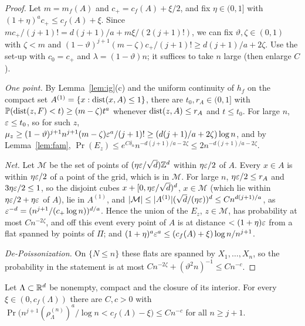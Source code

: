 \documentclass[11pt]{article}
\begin{document}
\begin{proof}
Let $m=m_f(A)$ and $c_+=c_f(A)+\xi/2$, and fix $\eta\in(0,1]$ with $(1+\eta)^ac_+\le c_f(A)+\xi$. Since $mc_+/(j+1)!=d(j+1)/a+m\xi/(2(j+1)!)$,
we can fix $\vartheta,\zeta\in(0,1)$ with $\zeta<m$ and $(1-\vartheta)^{j+1}(m-\zeta)c_+/(j+1)!\ge d(j+1)/a+2\zeta$. Use the set-up with $c_0=c_+$ and
$\lambda=(1-\vartheta)n$; it suffices to take $n$ large (then enlarge $C$).

\emph{One point.} By Lemma~\ref{lem:ig}(c) and the uniform continuity of $h_f$ on the compact set $A^{(1)}=\{x:\operatorname{dist}(x,A)\le1\}$,
there are $t_0,r_A\in(0,1]$ with $\mathbb{P}(\operatorname{dist}(z,F)<t)\ge(m-\zeta)t^a$ whenever $\operatorname{dist}(z,A)\le r_A$ and $t\le t_0$. For large $n$, $\varepsilon\le t_0$, so
for such $z$, $\mu_z\ge(1-\vartheta)^{j+1}n^{j+1}(m-\zeta)\varepsilon^a/(j+1)!\ge(d(j+1)/a+2\zeta)\log n$, and by Lemma~\ref{lem:fam},
$\Pr(E_z)\le e^{C\delta_n}n^{-d(j+1)/a-2\zeta}\le2n^{-d(j+1)/a-2\zeta}$.

\emph{Net.} Let $\mathcal M$ be the set of points of $(\eta\varepsilon/\sqrt d)\mathbb{Z}^d$ within $\eta\varepsilon/2$ of $A$. Every $x\in A$ is within $\eta\varepsilon/2$
of a point of the grid, which is in $\mathcal M$. For large $n$, $\eta\varepsilon/2\le r_A$ and $3\eta\varepsilon/2\le1$, so the disjoint cubes $x+[0,\eta\varepsilon/\sqrt d)^d$,
$x\in\mathcal M$ (which lie within $\eta\varepsilon/2+\eta\varepsilon$ of $A$), lie in $A^{(1)}$, and $|\mathcal M|\le|A^{(1)}|(\sqrt d/(\eta\varepsilon))^d\le Cn^{d(j+1)/a}$, as
$\varepsilon^{-d}=(n^{j+1}/(c_+\log n))^{d/a}$. Hence the union of the $E_z$, $z\in\mathcal M$,
has probability at most $Cn^{-2\zeta}$, and off this event every point of $A$ is at distance $<(1+\eta)\varepsilon$ from a flat spanned by
points of $\Pi$; and $(1+\eta)^a\varepsilon^a\le(c_f(A)+\xi)\log n/n^{j+1}$.

\emph{De-Poissonization.} On $\{N\le n\}$ these flats are spanned by $X_1,\dots,X_n$, so the probability in the statement is at most
$Cn^{-2\zeta}+(\vartheta^2n)^{-1}\le Cn^{-c}$.
\end{proof}

\begin{proposition}\label{prop:lower}
Let $\Lambda\subset\mathbb{R}^d$ be nonempty, compact and the closure of its interior. For every $\xi\in(0,c_f(\Lambda))$ there are $C,c>0$ with
$\Pr\bigl(n^{j+1}(\rho_\Lambda^{(n)})^a/\log n<c_f(\Lambda)-\xi\bigr)\le Cn^{-c}$ for all $n\ge j+1$.
\end{proposition}
\end{document}
